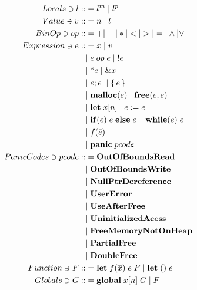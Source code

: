 \begingroup
\setlength{\jot}{-0.2ex} 
	\begin{align*}
		Locals \ni l ::&= l^m \;|\; l^p &&\\ 
		Value \ni v ::&= n \;|\; l && \\
		BinOp \ni op ::&= + | - | * | < | > | = | \land | \lor \\
		Expression \ni e ::&= x \;|\; v \\
		&|\; e\; op\; e \;|\; !e  \\
		&|\; \text{*}e \;|\; \&x \\
		&|\; e;e \; \;|\; \{\,e\,\} \; \\ 
		&|\; \mathbf{malloc}(e) \;|\; \mathbf{free}(e, e) \; \\ 
		&|\; \mathbf{let}\; x[n] \;|\; e := e \; \\
		&|\; \mathbf{if}(e) \; e \; \mathbf{else} \; e \; \;|\; \mathbf{while}(e) \; e \\
		&|\; f(\bar e) \\ 
		&|\; \mathbf{panic}\;pcode \\ 
		PanicCodes \ni pcode ::&= \mathbf{OutOfBoundsRead}\\
		&|\; \mathbf{OutOfBoundsWrite}\\
		&|\; \mathbf{NullPtrDereference}\\
		&|\; \mathbf{UserError}\\
		&|\; \mathbf{UseAfterFree}\\
		&|\; \mathbf{UninitializedAcess}\\
		&|\; \mathbf{FreeMemoryNotOnHeap}\\
		&|\; \mathbf{PartialFree}\\
		&|\; \mathbf{DoubleFree}\\
		Function \ni F ::&= \mathbf{let} \; f(\overline{x})\; e \; F \; | \; \mathbf{let}\;() \; e \\
		Globals \ni G ::&= \mathbf{global}\; x[n] \;G \;|\; F
	\end{align*}
\endgroup

